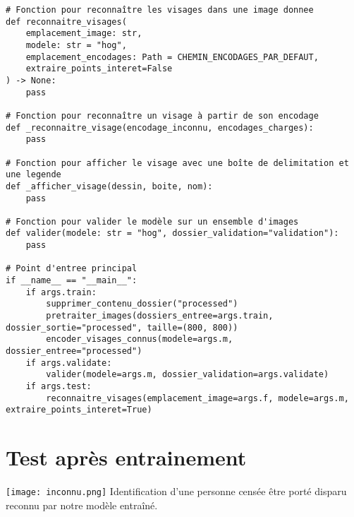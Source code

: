 \documentclass[a4paper,12pt]{report}
\begin{document}
\begin{lstlisting}[caption={Extrait du code source du projet}]
# Fonction pour reconnaître les visages dans une image donnee
def reconnaitre_visages(
    emplacement_image: str,
    modele: str = "hog",
    emplacement_encodages: Path = CHEMIN_ENCODAGES_PAR_DEFAUT,
    extraire_points_interet=False
) -> None:
    pass

# Fonction pour reconnaître un visage à partir de son encodage
def _reconnaitre_visage(encodage_inconnu, encodages_charges):
    pass

# Fonction pour afficher le visage avec une boîte de delimitation et une legende
def _afficher_visage(dessin, boite, nom):
    pass

# Fonction pour valider le modèle sur un ensemble d'images
def valider(modele: str = "hog", dossier_validation="validation"):
    pass

# Point d'entree principal
if __name__ == "__main__":
    if args.train:
        supprimer_contenu_dossier("processed")
        pretraiter_images(dossiers_entree=args.train, dossier_sortie="processed", taille=(800, 800))
        encoder_visages_connus(modele=args.m, dossier_entree="processed")
    if args.validate:
        valider(modele=args.m, dossier_validation=args.validate)
    if args.test:
        reconnaitre_visages(emplacement_image=args.f, modele=args.m, extraire_points_interet=True)
\end{lstlisting}

\section{Test après entrainement}
\texttt{[image: inconnu.png]} \newline
Identification d'une personne censée être porté disparu reconnu par notre modèle entraîné.
\end{document}
